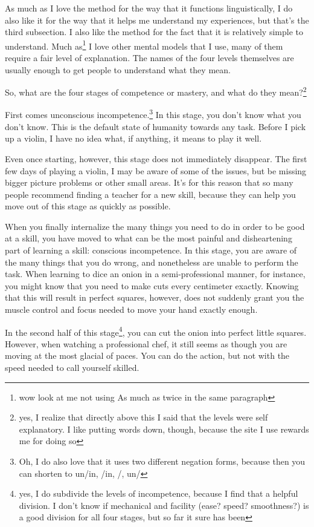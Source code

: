 \documentclass[12pt]{article}
\renewcommand{\,}{\textsuperscript{,}}
\begin{document}
As much as I love the method for the way that it functions linguistically, I do also like it for the way that it helps me understand my experiences, but that's the third subsection.  
I also like the method for the fact that it is relatively simple to understand.  
Much as\footnote{wow look at me not using As much as twice in the same paragraph} I love other mental models that I use, many of them require a fair level of explanation.  
The names of the four levels themselves are usually enough to get people to understand what they mean.

So, what are the four stages of competence or mastery, and what do they mean?\footnote{yes, I realize that directly above this I said that the levels were self explanatory.  
I like putting words down, though, because the site I use rewards me for doing so}

First comes unconscious incompetence.\footnote{Oh, I do also love that it uses two different negation forms, because then you can shorten to un/in, /in, /, un/}  
In this stage, you don't know what you don't know.  
This is the default state of humanity towards any task.  
Before I pick up a violin, I have no idea what, if anything, it means to play it well.

Even once starting, however, this stage does not immediately disappear.  
The first few days of playing a violin, I may be aware of some of the issues, but be missing bigger picture problems or other small areas.  
It's for this reason that so many people recommend finding a teacher for a new skill, because they can help you move out of this stage as quickly as possible.

When you finally internalize the many things you need to do in order to be good at a skill, you have moved to what can be the most painful and disheartening part of learning a skill: conscious incompetence.  
In this stage, you are aware of the many things that you do wrong, and nonetheless are unable to perform the task.  
When learning to dice an onion in a semi-professional manner, for instance, you might know that you need to make cuts every centimeter exactly.  
Knowing that this will result in perfect squares, however, does not suddenly grant you the muscle control and focus needed to move your hand exactly enough.

In the second half of this stage\footnote{yes, I do subdivide the levels of incompetence, because I find that a helpful division. I don't know if mechanical and facility (ease? speed? smoothness?) is a good division for all four stages, but so far it sure has been}, you can cut the onion into perfect little squares.  
However, when watching a professional chef, it still seems as though you are moving at the most glacial of paces.  
You can do the action, but not with the speed needed to call yourself skilled.
\end{document}
